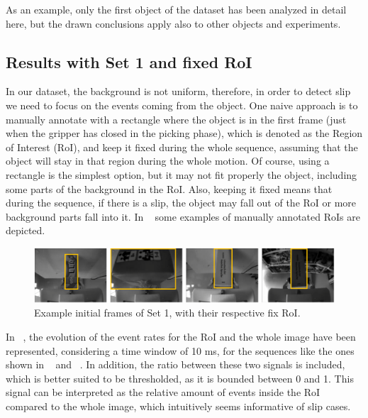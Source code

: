 As an example, only the first object of the dataset has been analyzed in detail here, but the drawn conclusions apply also to other objects and experiments.

\subsection{Results with Set 1 and fixed RoI}

In our dataset, the background is not uniform, therefore, in order to detect slip we need to focus on the events coming from the object. One naive approach is to manually annotate with a rectangle where the object is in the first frame (just when the gripper has closed in the picking phase), which is denoted as the Region of Interest (RoI), and keep it fixed during the whole sequence, assuming that the object will stay in that region during the whole motion. Of course, using a rectangle is the simplest option, but it may not fit properly the object, including some parts of the background in the RoI. Also, keeping it fixed means that during the sequence, if there is a slip, the object may fall out of the RoI or more background parts fall into it. In ~ some examples of manually annotated RoIs are depicted.

\begin{figure}[h]
    \centering
    \includegraphics[width=\textwidth]{resources/images/fix_roi}
    \caption{Example initial frames of Set 1, with their respective fix RoI.}\label{fig:fix_roi}
\end{figure}

In ~, the evolution of the event rates for the RoI and the whole image have been represented, considering a time window of 10 ms, for the sequences like the ones shown in ~ and ~. In addition, the ratio between these two signals is included, which is better suited to be thresholded, as it is bounded between 0 and 1. This signal can be interpreted as the relative amount of events inside the RoI compared to the whole image, which intuitively seems informative of slip cases. 

